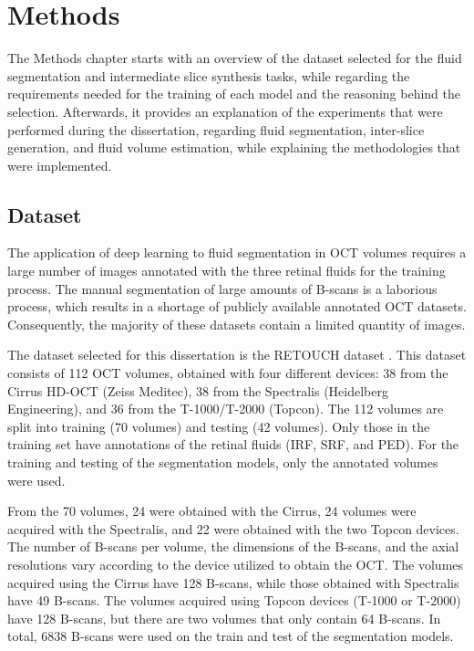 \chapter{Methods}\label{Methods}
The Methods chapter starts with an overview of the dataset selected for the fluid segmentation and intermediate slice synthesis tasks, while regarding the requirements needed for the training of each model and the reasoning behind the selection. Afterwards, it provides an explanation of the experiments that were performed during the dissertation, regarding fluid segmentation, inter-slice generation, and fluid volume estimation, while explaining the methodologies that were implemented.

\section{Dataset}
The application of deep learning to fluid segmentation in OCT volumes requires a large number of images annotated with the three retinal fluids for the training process. The manual segmentation of large amounts of B-scans is a laborious process, which results in a shortage of publicly available annotated OCT datasets. Consequently, the majority of these datasets contain a limited quantity of images.
\par
The dataset selected for this dissertation is the RETOUCH dataset \parencite{Bogunovic2019b}. This dataset consists of 112 OCT volumes, obtained with four different devices: 38 from the Cirrus HD-OCT (Zeiss Meditec), 38 from the Spectralis (Heidelberg Engineering), and 36 from the \mbox{T-1000}/T-2000 (Topcon). The 112 volumes are split into training (70 volumes) and testing (42 volumes). Only those in the training set have annotations of the retinal fluids (IRF, SRF, and PED). For the training and testing of the segmentation models, only the annotated volumes were used.
\par
From the 70 volumes, 24 were obtained with the Cirrus, 24 volumes were acquired with the Spectralis, and 22 were obtained with the two Topcon devices. The number of B-scans per volume, the dimensions of the B-scans, and the axial resolutions vary according to the device utilized to obtain the OCT. The volumes acquired using the Cirrus have 128 B-scans, while those obtained with Spectralis have 49 B-scans. The volumes acquired using Topcon devices (\mbox{T-1000} or \mbox{T-2000}) have 128 B-scans, but there are two volumes that only contain 64 \mbox{B-scans}. In total, 6838 B-scans were used on the train and test of the segmentation models.
